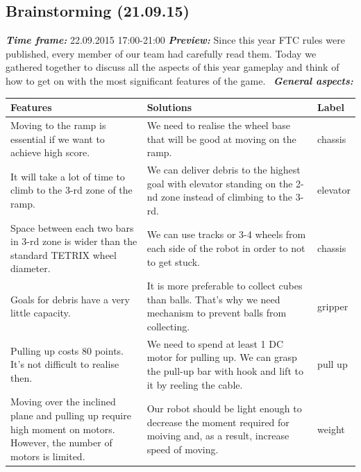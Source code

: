 \subsection{Brainstorming (21.09.15)}
	\textit{\textbf{Time frame:}} 22.09.2015 17:00-21:00 \newline
	\textit{\textbf{Preview:}} Since this year FTC rules were published, every member of our team had carefully read them. Today we gathered together to discuss all the aspects of this year gameplay and think of how to get on with the most significant features of the game. \newline \newline
	\textit{\textbf{General aspects:}}
	\begin{table}[H]
		\vspace{-2mm}
		\begin{center}
			\begin{tabular}{|p{0.4\linewidth}|p{0.5\linewidth}|p{0.1\linewidth}|}
				\hline
				Features & Solutions & Label \\
				\hline
				Moving to the ramp is essential if we want to achieve high score. & We need to realise the wheel base that will be good at moving on the ramp. & chassis \\
				\hline
				It will take a lot of time to climb to the 3-rd zone of the ramp. & We can deliver debris to the highest goal with elevator standing on the 2-nd zone instead of climbing to the 3-rd. & elevator \\
				\hline
				Space between each two bars in 3-rd zone is wider than the standard TETRIX wheel diameter. & We can use tracks or 3-4 wheels from each side of the robot in order to not to get stuck. & chassis \\
				\hline
				Goals for debris have a very little capacity. & It is more preferable to collect cubes than balls. That's why we need mechanism to prevent balls from collecting. & gripper \\
				\hline
				Pulling up costs 80 points. It's not difficult to realise then. & We need to spend at least 1 DC motor for pulling up. We can grasp the pull-up bar with hook and lift to it by reeling the cable. & pull up \\
				\hline
				Moving over the inclined plane and pulling up require high moment on motors. However, the number of motors is limited. & Our robot should be light enough to decrease the moment required for moiving and, as a result, increase speed of moving. & weight \\
				\hline

\end{tabular}
\end{center}
\end{table}
